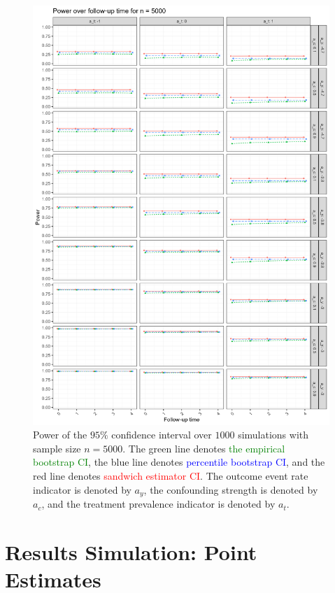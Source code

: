 \documentclass[pdflatex,sn-vancouver-ay]{sn-jnl}%
\theoremstyle{thmstyleone}%
\theoremstyle{thmstyletwo}%
\theoremstyle{thmstylethree}%
\begin{document}
\begin{appendices}
\begin{figure}[H]
\centering
\includegraphics[height=0.95\textheight]{plots/plots_power5000.png}
\caption{Power of the $95\%$ confidence interval over $1000$ simulations with sample size $n = 5000$. The green line denotes \textcolor{green}{the empirical bootstrap CI}, the blue line denotes \textcolor{blue}{percentile bootstrap CI}, and the red line denotes \textcolor{red}{sandwich estimator CI}. The outcome event rate indicator is denoted by $a_y$, the confounding strength is denoted by $a_c$, and the treatment prevalence indicator is denoted by $a_t$.}
\label{plt:power5000}
\end{figure}

\newpage


\section{Results Simulation: Point Estimates}\label{ApxSim1PE}


\end{appendices}
\end{document}
